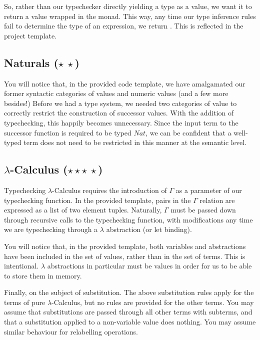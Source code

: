\documentclass{exam}
\let\OldTexttt\texttt
\renewcommand{\texttt}[1]{\OldTexttt{\color{teal}{#1}}}
\begin{document}
So, rather than our typechecker directly yielding a type as a value, we want it to return a value wrapped in the \texttt{Maybe} monad.  This way, any time our type inference rules fail to determine the type of an expression, we return \texttt{Nothing}.  This is reflected in the project template.

\subsection{Naturals ($\star\:\star$)}

\texttt{[image: figures/Nat-E.png]}
\texttt{[image: figures/Nat-T.png]}

You will notice that, in the provided code template, we have amalgamated our former syntactic categories of values and numeric values (and a few more besides!)  Before we had a type system, we needed two categories of value to correctly restrict the construction of successor values.  With the addition of typechecking, this happily becomes unnecessary.  Since the input term to the successor function is required to be typed $Nat$, we can be confident that a well-typed term does not need to be restricted in this manner at the semantic level.  

\subsection{$\lambda$-Calculus ($\star\star\star\:\star$)}

\texttt{[image: figures/STPLC.png]}
\texttt{[image: figures/substitution.png]}

Typechecking $\lambda$-Calculus requires the introduction of $\Gamma$ as a parameter of our typechecking function.  In the provided template, pairs in the $\Gamma$ relation are expressed as a list of two element tuples.  Naturally, $\Gamma$ must be passed down through recursive calls to the typechecking function, with modifications any time we are typechecking through a $\lambda$ abstraction (or let binding).  

You will notice that, in the provided template, both variables and abstractions have been included in the set of values, rather than in the set of terms.  This is intentional.  $\lambda$ abstractions in particular must be values in order for us to be able to store them in memory.  

Finally, on the subject of substitution.  The above substitution rules apply for the terms of pure $\lambda$-Calculus, but no rules are provided for the other terms.  You may assume that substitutions are passed through all other terms with subterms, and that a substitution applied to a non-variable value does nothing.  You may assume similar behaviour for relabelling operations.  
\end{document}
